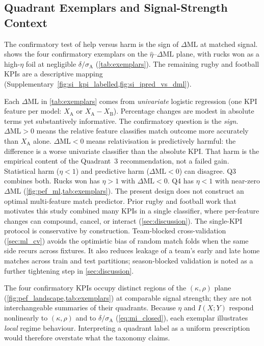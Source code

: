 \subsection{Quadrant Exemplars and Signal-Strength Context}
\label{sec:exemplars}

The confirmatory test of help versus harm is the sign of $\Delta\mathrm{ML}$ at matched signal.  shows the four confirmatory exemplars on the $\hat\eta$--$\Delta\mathrm{ML}$ plane, with rucks won as a high-$\eta$ foil at negligible $\delta/\sigma_{\mathrm{A}}$ (\cref{tab:exemplars}). The remaining rugby and football KPIs are a descriptive mapping (Supplementary~\cref{fig:si_kpi_labelled,fig:si_ipred_vs_dml}).

Each $\Delta\mathrm{ML}$ in \cref{tab:exemplars} comes from \emph{univariate} logistic regression (one KPI feature per model: $X_{\mathrm{A}}$ or $X_{\mathrm{A}}-X_{\mathrm{B}}$). Percentage changes are modest in absolute terms yet substantively informative. The confirmatory question is the \emph{sign}. $\Delta\mathrm{ML}>0$ means the relative feature classifies match outcome more accurately than $X_{\mathrm{A}}$ alone. $\Delta\mathrm{ML}<0$ means relativisation is predictively harmful: the difference is a worse univariate classifier than the absolute KPI. That harm is the empirical content of the Quadrant~3 recommendation, not a failed gain. Statistical harm ($\eta<1$) and predictive harm ($\Delta\mathrm{ML}<0$) can disagree. Q3 combines both. Rucks won has $\eta>1$ with $\Delta\mathrm{ML}<0$. Q4 has $\eta<1$ with near-zero $\Delta\mathrm{ML}$ (\cref{fig:pef_ml,tab:exemplars}). The present design does not construct an optimal multi-feature match predictor. Prior rugby and football work that motivates this study combined many KPIs in a single classifier, where per-feature changes can compound, cancel, or interact (\cref{sec:discussion}). The single-KPI protocol is conservative by construction. Team-blocked cross-validation (\cref{sec:ml_cv}) avoids the optimistic bias of random match folds when the same side recurs across fixtures. It also reduces leakage of a team's early and late home matches across train and test partitions; season-blocked validation is noted as a further tightening step in \cref{sec:discussion}.

The four confirmatory KPIs occupy distinct regions of the $(\kappa,\rho)$ plane (\cref{fig:pef_landscape,tab:exemplars}) at comparable signal strength; they are not interchangeable summaries of their quadrants. Because $\eta$ and $I(X;Y)$ respond nonlinearly to $(\kappa,\rho)$ and to $\delta/\sigma_{\mathrm{A}}$ (\cref{eq:mi_closed}), each exemplar illustrates \emph{local} regime behaviour. Interpreting a quadrant label as a uniform prescription would therefore overstate what the taxonomy claims.

